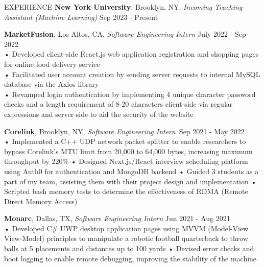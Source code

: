 \documentclass{resume} %
\begin{document}
\begin{rSection}{EXPERIENCE}
\textbf{New York University}, Brooklyn, NY, {\emph{Incoming Teaching Assistant (Machine Learning)}} \hfill Sep 2023 - Present

\textbf{MarketFusion}, Los Altos, CA, {\emph{Software Engineering Intern}} \hfill July 2022 - Sep 2022 \\
• Developed client-side React.js web application registration and shopping pages for online food delivery service \\
• Facilitated user account creation by sending server requests to internal MySQL database via the Axios library \\
• Revamped login authentication by implementing 4 unique character password checks and a length requirement of 8-20 characters client-side via regular expressions and server-side to aid the security of the website 

\textbf{Corelink}, Brooklyn, NY, {\emph{Software Engineering Intern}}\ \hfill Sep 2021 - May 2022 \\
• Implemented a C++ UDP network packet splitter to enable researchers to bypass Corelink's MTU limit from 20,000 to 64,000 bytes, increasing maximum throughput by 220\% \newline
• Designed Next.js/React interview scheduling platform using Auth0 for authentication and MongoDB backend \newline
• Guided 3 students as a part of my team, assisting them with their project design and implementation \newline
• Scripted bash memory tests to determine the effectiveness of RDMA (Remote Direct Memory Access) 

\textbf{Monarc}, Dallas, TX, {\emph{Software Engineering Intern}} \hfill Jun 2021 - Aug 2021 \\
• Developed C\# UWP desktop application pages using MVVM (Model-View View-Model) principles to manipulate a robotic football quarterback to throw balls at 5 placements and distances up to 100 yards \newline
• Devised error checks and boot logging to enable remote debugging, improving the stability of the machine \smallskip
\end{rSection} 
\end{document}
